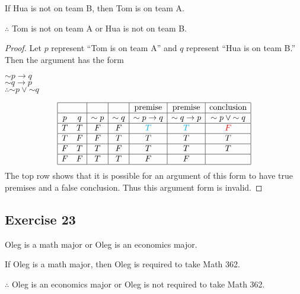 \documentclass[14pt]{extarticle}
\begin{document}
If Hua is not on team B, then Tom is on team A.

$\therefore$ Tom is not on team A or Hua is not on team B.

\begin{proof} Let $p$ represent “Tom is on team A” and $q$ represent “Hua is on team B.” Then the argument has the form

    \begin{center}
        ${\sim p} \to q$ \\
        ${\sim q} \to p$ \\
        $\therefore {\sim p} \vee {\sim q}$ \\
    \end{center}

    $$
        \begin{array}{|cc|c|c|c|c|c|}
            \hline
              &   &          &          & \text{premise} & \text{premise} & \text{conclusion}      \\
            \hline
            p & q & {\sim p} & {\sim q} & {\sim p} \to q & {\sim q} \to p & {\sim p} \vee {\sim q} \\
            \hline
            T & T & F        & F        & \color{cyan}T  & \color{cyan}T  & \color{red}F           \\
            \hline
            T & F & F        & T        & T              & T              & T                      \\
            \hline
            F & T & T        & F        & T              & T              & T                      \\
            \hline
            F & F & T        & T        & F              & F              &                        \\
            \hline
        \end{array}
    $$
    The top row shows that it is possible for an argument of this form to have true premises and a false conclusion. Thus this argument form is invalid.
\end{proof}

\subsection{Exercise 23}
Oleg is a math major or Oleg is an economics major.

If Oleg is a math major, then Oleg is required to take Math 362.

$\therefore$ Oleg is an economics major or Oleg is not required to take Math 362.
\end{document}
